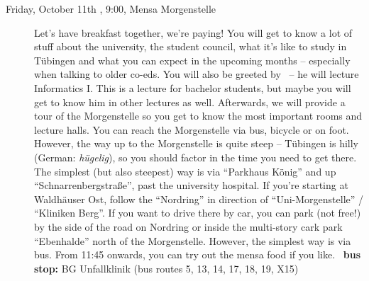 \begin{description}
\ifml 
\item[Friday, October 11th \YEAR, 9:00, Mensa Morgenstelle]
Let's have breakfast together, we're paying! You will get to know a lot of stuff about the university, the student council, what it's like to study in Tübingen and what you can expect in the upcoming months -- especially when talking to older co-eds.
\ifwintersemester You will also be greeted by \Infoprof~-- he will lecture Informatics I. This is a lecture for bachelor students, but maybe you will get to know him in other lectures as well. \fi  
Afterwards, we will provide a tour of the Morgenstelle so you get to know the most important rooms and lecture halls.
You can reach the Morgenstelle via bus, bicycle or on foot. However, the way up to the Morgenstelle is quite steep -- Tübingen is hilly (German: \emph{hügelig}), so you should factor in the time you need to get there.
The simplest (but also steepest) way is via "`Parkhaus König"' and up "`Schnarrenbergstraße"', past the university hospital. If you're starting at Waldhäuser Ost, follow the "`Nordring"' in direction of "`Uni-Morgenstelle"' / "`Kliniken Berg"'. 
If you want to drive there by car, you can park (not free!) by the side of the road on Nordring or inside the multi-story cark park "`Ebenhalde"' north of the Morgenstelle. However, the simplest way is via bus.
From 11:45 onwards, you can try out the mensa food if you like.
~\textbf{bus stop:} BG Unfallklinik (bus routes 5, 13, 14, 17, 18, 19, X15)


\end{description}
